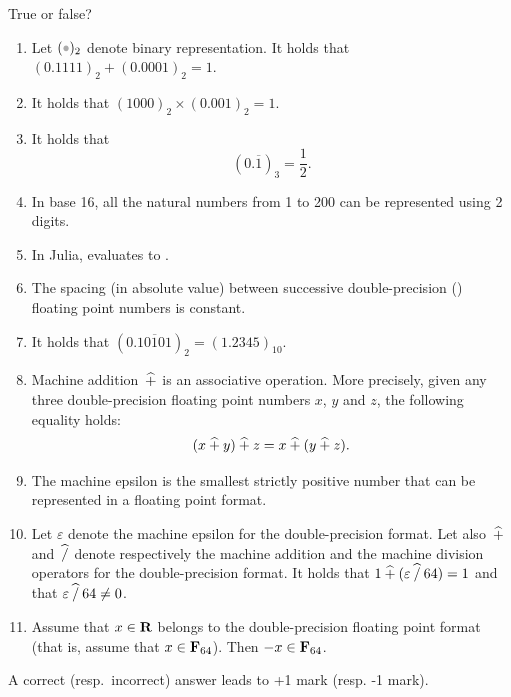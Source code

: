 \begin{exercise}
    True or false?
    \begin{enumerate}
        \item Let $(\placeholder)_2$ denote binary representation.
            It holds that
            \(
                (0.1111)_2 + (0.0001)_2 = 1.
            \)
        \item It holds that
            \(
                (1000)_2 \times (0.001)_2 = 1.
            \)
        \item It holds that
            \[
                (0.\overline{1})_3 = \frac{1}{2}.
            \]
        \item In base 16, all the natural numbers from 1 to 200 can be represented using 2 digits.
        \item In Julia,  evaluates to .
        \item The spacing (in absolute value) between successive double-precision () floating point numbers is constant.
        \item It holds that $(0.\overline{10101})_2 = (1.2345)_{10}$.
        \item Machine addition~$\mathbin{\widehat +}$ is an associative operation.
            More precisely, given any three double-precision floating point numbers $x$, $y$ and $z$,
            the following equality holds:
            \[
                (x \mathbin{\widehat +} y) \mathbin{\widehat +} z = x \mathbin{\widehat +} (y \mathbin{\widehat +} z).
            \]
        \item
            The machine epsilon is the smallest strictly positive number that can be represented in a floating point format.

        \item
            Let $\varepsilon$ denote the machine epsilon for the double-precision format.
            Let also~$\mathbin{\widehat +}$ and~$\mathbin{\widehat /}$ denote respectively the machine addition and the machine division operators for the double-precision format.
            It holds that $1 \mathbin{\widehat +} (\varepsilon \mathbin{\widehat /} 64) = 1$ and that $\varepsilon \mathbin{\widehat /} 64 \neq 0$.

        \item
            Assume that $x \in \mathbf R$ belongs to the double-precision floating point format (that is,
            assume that $x \in \mathbf F_{64}$).
            Then $-x \in \mathbf F_{64}$.
    \end{enumerate}
    A correct (resp.~incorrect) answer leads to +1 mark (resp. -1 mark).
\end{exercise}
